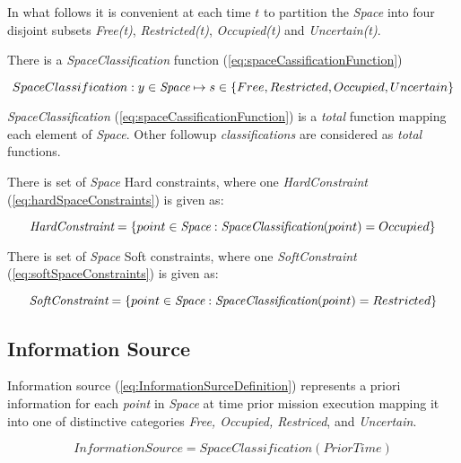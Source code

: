     \noindent In what follows it is convenient at each time $t$ to partition the \emph{Space} into four disjoint subsets \emph{Free(t)}, \emph{Restricted(t)}, \emph{Occupied(t)} and \emph{Uncertain(t)}.

    There is a \emph{SpaceClassification}  function (\ref{eq:spaceCassificationFunction})
    
    \begin{equation}\label{eq:spaceCassificationFunction}
        SpaceClassification: y \in \emph{Space} \mapsto s \in \{Free, Restricted, Occupied, Uncertain \}
    \end{equation}

    \begin{note}
        \emph{SpaceClassification} (\ref{eq:spaceCassificationFunction}) is a \emph{total} function mapping each element of \emph{Space}. Other followup \emph{classifications} are considered as \emph{total} functions. 
    \end{note}

    There is set of \emph{Space} Hard constraints, where one \emph{HardConstraint} (\ref{eq:hardSpaceConstraints}) is given as:

    \begin{equation}\label{eq:hardSpaceConstraints}
        \emph{HardConstraint} = \{point \in \emph{Space}: \emph{SpaceClassification}(point) = Occupied \}
    \end{equation}

    There is set of \emph{Space} Soft constraints, where one \emph{SoftConstraint} (\ref{eq:softSpaceConstraints}) is given as:

    \begin{equation}\label{eq:softSpaceConstraints}
        \emph{SoftConstraint} = \{point \in \emph{Space}: \emph{SpaceClassification}(point) = Restricted \}
    \end{equation}

\subsection{Information Source}\label{s:informationSources}
    \begin{definition}{Information source} \label{def:InformationSurceDefinition}         
        (\ref{eq:InformationSurceDefinition}) represents a priori information for each \emph{point} in \emph{Space} at time prior mission execution mapping it into one of distinctive categories \emph{Free, Occupied, Restriced}, and \emph{Uncertain}.
        
        \begin{equation}\label{eq:InformationSurceDefinition}
            InformationSource = SpaceClassification(PriorTime)
        \end{equation}
    \end{definition}


